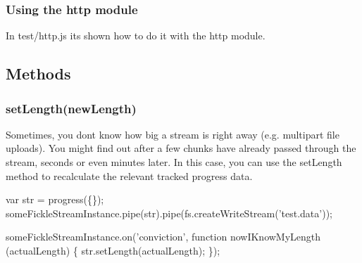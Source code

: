 \subsubsection*{Using the http module}

In {\ttfamily test/http.\+js} it\textquotesingle{}s shown how to do it with the http module.

\subsection*{Methods}

\subsubsection*{{\ttfamily set\+Length(new\+Length)}}

Sometimes, you don\textquotesingle{}t know how big a stream is right away (e.\+g. multipart file uploads). You might find out after a few chunks have already passed through the stream, seconds or even minutes later. In this case, you can use the {\ttfamily set\+Length} method to recalculate the relevant tracked progress data.


\begin{DoxyCode}
var str = progress(\{\});
someFickleStreamInstance.pipe(str).pipe(fs.createWriteStream('test.data'));

someFickleStreamInstance.on('conviction', function nowIKnowMyLength (actualLength) \{
  str.setLength(actualLength);
\});
\end{DoxyCode}
 